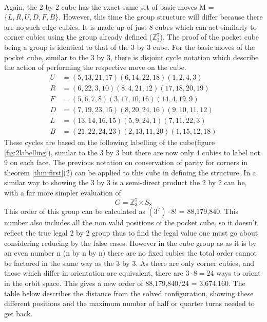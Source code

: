 \documentclass{article}
\newcounter{theo}[section]\setcounter{theo}{0}
\begin{document}
\paragraph*{}
Again, the 2 by 2 cube has the exact same set of basic moves M = $\{L,R,U,D,F,B\}$. However, this time the group structure will differ because there are no such edge cubies. It is made up of just 8 cubes which can act similarly to corner cubies using the group already defined ($\mathbb{Z}_{3}^{7}$). The proof of the pocket cube being a group is identical to that of the 3 by 3 cube.
For the basic moves of the pocket cube, similar to the 3 by 3, there is disjoint cycle notation which describe the action of performing the respective move on the cube. 
\begin{align*}
U&=(5,13,21,17)(6,14,22,18)(1,2,4,3)\\
R&=(6,22,3,10)(8,4,21,12)(17,18,20,19)\\
F&=(5,6,7,8)(3,17,10,16)(14,4,19,9)\\
D&=(7,19,23,15)(8,20,24,16)(9,10,11,12)\\
L&=(13,14,16,15)(5,9,24,1)(7,11,22,3)\\
B&= (21,22,24,23)(2,13,11,20)(1,15,12,18)
\end{align*}
These cycles are based on the following labelling of the cube(figure \ref{fig:2labelling}), similar to the 3 by 3 but there are now only 4 cubies to label not 9 on each face. The previous notation on conservation of parity for corners in theorem \ref{thm:first}(2) can be applied to this cube in defining the structure. In a similar way to showing the 3 by 3 is a semi-direct product the 2 by 2 can be, with a far more simpler evaluation of 
\begin{equation}
G = \mathbb{Z}^{7}_{3} \rtimes S_8
\end{equation}
This order of this group can be calculated as $(3^7)\cdot 8!$ = 88,179,840. This number also includes all the non valid positions of the pocket cube, so it doesn't reflect the true legal 2 by 2 group thus to find the legal value one must go about considering reducing by the false cases. However in the cube group as as it is by an even number n (n by n by n) there are no fixed cubies the total order cannot be factored in the same way as the 3 by 3. As there are only corner cubies, and those which differ in orientation are equivalent, there are $3\cdot 8=24$ ways to orient in the orbit space. This gives a new order of 88,179,840/24 = 3,674,160.
The table below describes the distance from the solved configuration, showing these different positions and the maximum number of half or quarter turns needed to get back.
\end{document}
